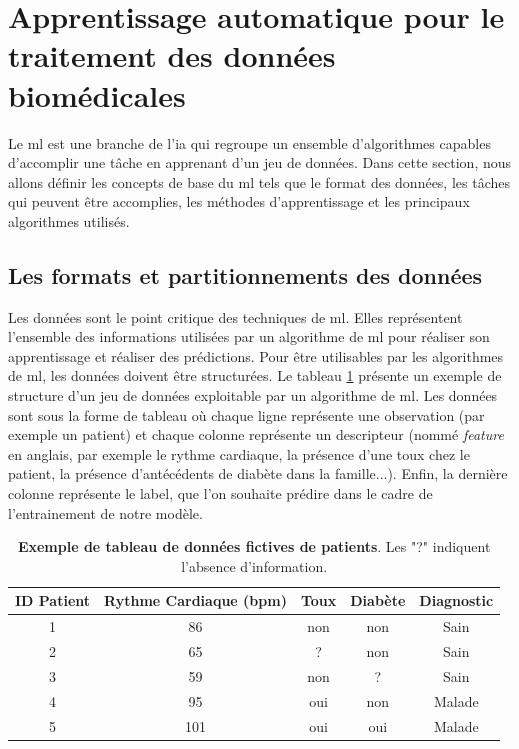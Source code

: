 \section{Apprentissage automatique pour le traitement des données biomédicales}
Le \gls{ml} est une branche de l'\gls{ia} qui regroupe un ensemble d'algorithmes capables d'accomplir une tâche en apprenant d'un jeu de données. Dans cette section, nous allons définir les concepts de base du \gls{ml} tels que le format des données, les tâches qui peuvent être accomplies, les méthodes d'apprentissage et les principaux algorithmes utilisés.

\subsection{Les formats et partitionnements des données}
Les données sont le point critique des techniques de \gls{ml}. Elles représentent l'ensemble des informations utilisées par un algorithme de \gls{ml} pour réaliser son apprentissage et réaliser des prédictions. Pour être utilisables par les algorithmes de \gls{ml}, les données doivent être structurées. Le tableau \ref{table:dataset_intro} présente un exemple de structure d'un jeu de données exploitable par un algorithme de \gls{ml}. Les données sont sous la forme de tableau où chaque ligne représente une observation (par exemple un patient) et chaque colonne représente un descripteur (nommé \textit{feature} en anglais, par exemple le rythme cardiaque, la présence d'une toux chez le patient, la présence d'antécédents de diabète dans la famille...). Enfin, la dernière colonne représente le label, que l'on souhaite prédire dans le cadre de l'entrainement de notre modèle.

\begin{table}[htbp]
\centering
\begin{tabular}{|c|c|c|c|c|} 
 \hline
 ID Patient & Rythme Cardiaque (bpm) & Toux & Diabète & Diagnostic \\
 \hline
 1 & 86 & non & non & Sain \\ 
 2 & 65 & ? & non & Sain \\ 
 3 & 59 & non & ? & Sain \\ 
 4 & 95 & oui & non & Malade \\ 
 5 & 101 & oui & oui & Malade\\ 
 \hline
\end{tabular}
\caption[Exemple de tableau de données fictives de patients]{\textbf{Exemple de tableau de données fictives de patients}. Les "?" indiquent l'absence d'information.}
\label{table:dataset_intro}
\end{table}

